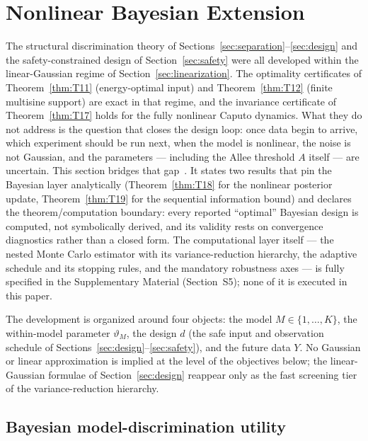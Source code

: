 \section{Nonlinear Bayesian Extension}
\label{sec:bayesian}

The structural discrimination theory of Sections~\ref{sec:separation}--\ref{sec:design} and the safety-constrained design of Section~\ref{sec:safety} were all developed within the linear-Gaussian regime of Section~\ref{sec:linearization}. The optimality certificates of Theorem~\ref{thm:T11} (energy-optimal input) and Theorem~\ref{thm:T12} (finite multisine support) are exact in that regime, and the invariance certificate of Theorem~\ref{thm:T17} holds for the fully nonlinear Caputo dynamics. What they do not address is the question that closes the design loop: once data begin to arrive, which experiment should be run next, when the model is nonlinear, the noise is not Gaussian, and the parameters --- including the Allee threshold $A$ itself --- are uncertain. This section bridges that gap~\cite{O05,O06,O07,O09}. It states two results that pin the Bayesian layer analytically (Theorem~\ref{thm:T18} for the nonlinear posterior update, Theorem~\ref{thm:T19} for the sequential information bound) and declares the theorem/computation boundary: every reported ``optimal'' Bayesian design is computed, not symbolically derived, and its validity rests on convergence diagnostics rather than a closed form. The computational layer itself --- the nested Monte Carlo estimator with its variance-reduction hierarchy, the adaptive schedule and its stopping rules, and the mandatory robustness axes --- is fully specified in the Supplementary Material (Section~S5); none of it is executed in this paper.

The development is organized around four objects: the model $M \in \{1,\dots,K\}$, the within-model parameter $\vartheta_M$, the design $d$ (the safe input and observation schedule of Sections~\ref{sec:design}--\ref{sec:safety}), and the future data $Y$. No Gaussian or linear approximation is implied at the level of the objectives below; the linear-Gaussian formulae of Section~\ref{sec:design} reappear only as the fast screening tier of the variance-reduction hierarchy.

\subsection{Bayesian model-discrimination utility}

